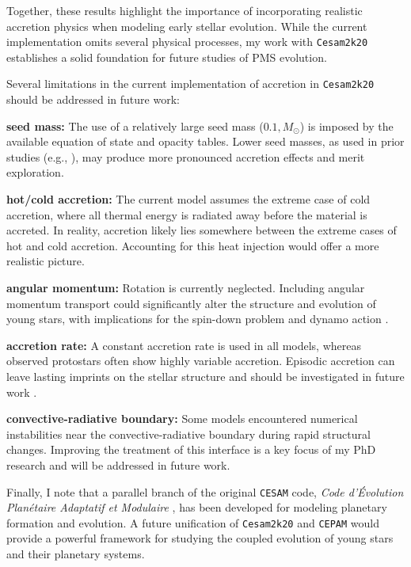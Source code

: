 \documentclass[12pt,a4paper]{article}
\begin{document}
Together, these results highlight the importance of incorporating realistic accretion physics when modeling early stellar evolution. While the current implementation omits several physical processes, my work with \texttt{Cesam2k20} establishes a solid foundation for future studies of PMS evolution.

Several limitations in the current implementation of accretion in \texttt{Cesam2k20} should be addressed in future work:

\textbf{seed mass:} The use of a relatively large seed mass ($0.1,M_\odot$) is imposed by the available equation of state and opacity tables. Lower seed masses, as used in prior studies (e.g., \textcite{KunitomoEtAl2017}), may produce more pronounced accretion effects and merit exploration.

\textbf{hot/cold accretion:} The current model assumes the extreme case of cold accretion, where all thermal energy is radiated away before the material is accreted. In reality, accretion likely lies somewhere between the extreme cases of hot and cold accretion. Accounting for this heat injection \parencite[e.g.,][]{HosokawaEtAl2011,KunitomoEtAl2017,AmardMatt2023} would offer a more realistic picture.

\textbf{angular momentum:} Rotation is currently neglected. Including angular momentum transport could significantly alter the structure and evolution of young stars, with implications for the spin-down problem \parencite[e.g., ][]{TakasaoEtAl2025} and dynamo action \parencite[e.g.,][]{StelzerNeuhauser2001}.

\textbf{accretion rate:} A constant accretion rate is used in all models, whereas observed protostars often show highly variable accretion. Episodic accretion can leave lasting imprints on the stellar structure and should be investigated in future work \parencite[e.g.,][]{BaraffeEtAl2009,BaraffeChabrier2010}.

\textbf{convective-radiative boundary:} Some models encountered numerical instabilities near the convective-radiative boundary during rapid structural changes. Improving the treatment of this interface is a key focus of my PhD research and will be addressed in future work.

Finally, I note that a parallel branch of the original \texttt{CESAM} code, \textit{Code d'Évolution Planétaire Adaptatif et Modulaire} \parencite[\texttt{CEPAM}; ][]{GuillotMorel1995}, has been developed for modeling planetary formation and evolution. A future unification of \texttt{Cesam2k20} and \texttt{CEPAM} would provide a powerful framework for studying the coupled evolution of young stars and their planetary systems.
\end{document}
